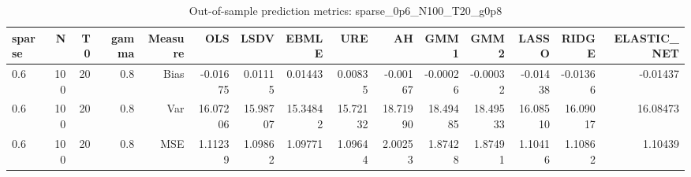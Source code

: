 \begin{table}[!htbp]\centering
\caption{Out-of-sample prediction metrics: sparse_0p6_N100_T20_g0p8}
\label{tab:table3_sparse_0p6_N100_T20_g0p8}
\begin{tabular}{lrrrrrrrrrrrrrr}
\hline
sparse & N & T0 & gamma & Measure & OLS & LSDV & EBMLE & URE & AH & GMM1 & GMM2 & LASSO & RIDGE & ELASTIC_NET \\
\hline
0.6 & 100 & 20 & 0.8 & Bias & -0.01675 & 0.01115 & 0.01443 & 0.00835 & -0.00167 & -0.00026 & -0.00032 & -0.01438 & -0.01366 & -0.01437 \\
0.6 & 100 & 20 & 0.8 & Var & 16.07206 & 15.98707 & 15.34842 & 15.72132 & 18.71990 & 18.49485 & 18.49533 & 16.08510 & 16.09017 & 16.08473 \\
0.6 & 100 & 20 & 0.8 & MSE & 1.11239 & 1.09862 & 1.09771 & 1.09644 & 2.00253 & 1.87428 & 1.87491 & 1.10416 & 1.10862 & 1.10439 \\
\hline
\end{tabular}
\end{table}

